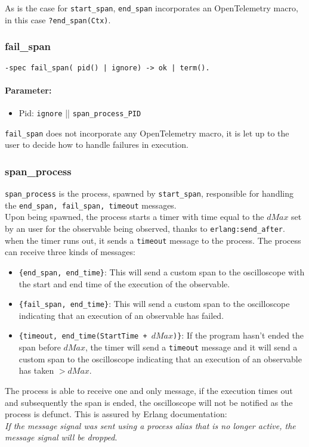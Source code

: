     As is the case for \texttt{start\_span}, \texttt{end\_span} incorporates an OpenTelemetry macro, in this case \texttt{?end\_span(Ctx)}. \\

        \subsubsection{fail\_span}
        \begin{verbatim}        
-spec fail_span( pid() | ignore) -> ok | term().
        \end{verbatim}
        \paragraph{Parameter:}
             \begin{itemize}
                \item Pid: \texttt{ignore} || \texttt{span\_process\_PID}
            \end{itemize}
            \texttt{fail\_span} does not incorporate any OpenTelemetry macro, it is let up to the user to decide how to handle failures in execution. \\
        

        \subsubsection{span\_process}
            \texttt{span\_process} is the process, spawned by \texttt{start\_span}, responsible for handling the \texttt{end\_span, fail\_span, timeout} messages. \\
            Upon being spawned, the process starts a timer with time equal to the $dMax$ set by an user for the observable being observed, thanks to \texttt{erlang:send\_after}. when the timer runs out, it sends a \texttt{timeout} message to the process.
        The process can receive three kinds of messages:
        \begin{itemize}
            \item \texttt{\{end\_span, end\_time\}}: This will send a custom span to the oscilloscope with the start and end time of the execution of the observable.
            \item \texttt{\{fail\_span, end\_time\}}: This will send a custom span to the oscilloscope indicating that an execution of an observable has failed.
            \item \texttt{\{timeout, end\_time(StartTime + $dMax$)\}}: If the program hasn't ended the span before $dMax$, the timer will send a \texttt{timeout} message and it will send a custom span to the oscilloscope indicating that an execution of an observable has taken $> dMax$.
        \end{itemize}
        The process is able to receive one and only message, if the execution times out and subsequently the span is ended, the oscilloscope will not be notified as the process is defunct. This is assured by Erlang documentation: \\
        \textit{If the message signal was sent using a process alias that is no longer active, the message signal will be dropped}. %

